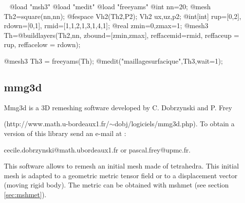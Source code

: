 \documentclass[a4paper,twoside,12pt]{book}
\begin{document}
\begin{example}
\label{freeyams}~
\bFF
@load "msh3"
@load "medit"
@load "freeyams"
@int nn=20;
@mesh Th2=square(nn,nn);
@fespace Vh2(Th2,P2);
Vh2 ux,uz,p2;
@int[int] rup=[0,2],  rdown=[0,1], rmid=[1,1,2,1,3,1,4,1];
@real zmin=0,zmax=1; 
@mesh3 Th=@buildlayers(Th2,nn, zbound=[zmin,zmax],
                          reffacemid=rmid, reffaceup = rup, reffacelow = rdown);

@mesh3 Th3 = freeyams(Th);
@medit("maillagesurfacique",Th3,wait=1);

\eFF
\end{example}

\subsection{mmg3d}
\label{sec:mmg3d}
Mmg3d is a 3D remeshing software developed by C. Dobrzynski and P. Frey 

(http://www.math.u-bordeaux1.fr/$\sim$dobj/logiciels/mmg3d.php). To obtain a version of this library send an e-mail at : 

cecile.dobrzynski@math.ubordeaux1.fr or pascal.frey@upmc.fr.

This software allows to remesh an initial mesh made of tetrahedra. This initial mesh is adapted to a geometric metric tensor field or to a displacement vector (moving rigid body). The metric can be obtained with mshmet (see section \ref{sec:mshmet}).\\
\end{document}
